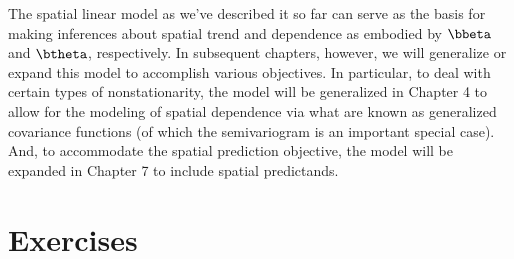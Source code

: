 The spatial linear model as we've described it so far can serve as the basis for making inferences about spatial trend and dependence as embodied by $\bbeta$ and $\btheta$, respectively.  In subsequent chapters, however, we will generalize or expand this model to accomplish various objectives.  In particular, to deal with certain types of nonstationarity, the model will be generalized in Chapter 4 to allow for the modeling of spatial dependence via what are known as generalized covariance functions (of which the semivariogram is an important special case).  And, to accommodate the spatial prediction objective, the model will be expanded in Chapter 7 to include spatial predictands.

\section{Exercises}
